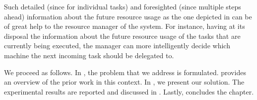 Such detailed (since for individual tasks) and foresighted (since multiple steps
ahead) information about the future resource usage as the one depicted in
 can be of great help to the resource manager of the
system. For instance, having at its disposal the information about the future
resource usage of the tasks that are currently being executed, the manager can
more intelligently decide which machine the next incoming task should be
delegated to.

We proceed as follows. In , the problem that we address is
formulated.  provides an overview of the prior work in this
context. In , we present our solution. The experimental
results are reported and discussed in . Lastly,
 concludes the chapter.
